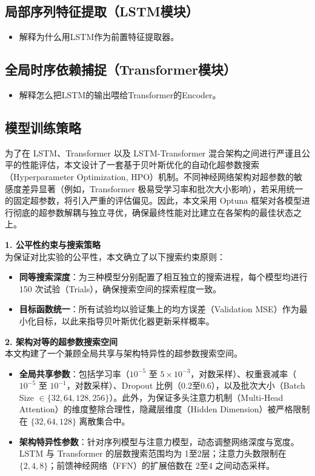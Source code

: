 \documentclass[UTF8,AutoFakeBold=1,AutoFakeSlant,zihao=-4]{SCAU}
\begin{document}
\subsection{局部序列特征提取（LSTM模块）}
\begin{itemize}
  \item 解释为什么用LSTM作为前置特征提取器。
\end{itemize}
\subsection{全局时序依赖捕捉（Transformer模块）}
\begin{itemize}
  \item 解释怎么把LSTM的输出喂给Transformer的Encoder。
\end{itemize}
\subsection{模型训练策略}
为了在 LSTM、Transformer 以及 LSTM-Transformer 混合架构之间进行严谨且公平的性能评估，本文设计了一套基于贝叶斯优化的自动化超参数搜索（Hyperparameter Optimization, HPO）机制。不同神经网络架构对超参数的敏感度差异显著（例如，Transformer 极易受学习率和批次大小影响），若采用统一的固定超参数，将引入严重的评估偏见。因此，本文采用 Optuna 框架对各模型进行彻底的超参数解耦与独立寻优，确保最终性能对比建立在各架构的最佳状态之上。

\textbf{1. 公平性约束与搜索策略} \\
为保证对比实验的公平性，本文确立了以下搜索约束原则：
\begin{itemize}
  \item \textbf{同等搜索深度}：为三种模型分别配置了相互独立的搜索进程，每个模型均进行 150 次试验（Trials），确保搜索空间的探索程度一致。
  \item \textbf{目标函数统一}：所有试验均以验证集上的均方误差（Validation MSE）作为最小化目标，以此来指导贝叶斯优化器更新采样概率。
\end{itemize}

\textbf{2. 架构对等的超参数搜索空间} \\
本文构建了一个兼顾全局共享与架构特异性的超参数搜索空间。
\begin{itemize}
  \item \textbf{全局共享参数}：包括学习率（$10^{-5}$ 至 $5 \times 10^{-3}$，对数采样）、权重衰减率（$10^{-5}$ 至 $10^{-1}$，对数采样）、Dropout 比例（0.2至0.6），以及批次大小（Batch Size $\in \{32, 64, 128, 256\}$）。此外，为保证多头注意力机制（Multi-Head Attention）的维度整除合理性，隐藏层维度（Hidden Dimension）被严格限制在 $\{32, 64, 128\}$ 离散集合中。
  \item \textbf{架构特异性参数}：针对序列模型与注意力模型，动态调整网络深度与宽度。LSTM 与 Transformer 的层数搜索范围均为 1至2层；注意力头数限制在 $\{2, 4, 8\}$；前馈神经网络（FFN）的扩展倍数在 2至4 之间动态采样。
\end{itemize}
\end{document}
